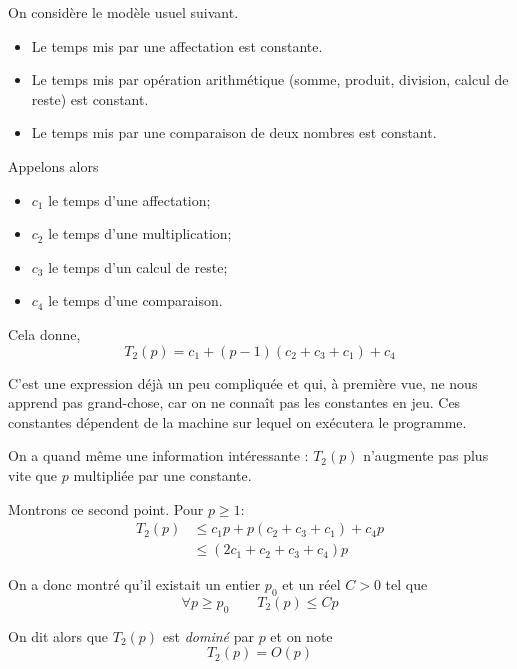 On considère le modèle usuel suivant.

\begin{itemize}
\item[\textbullet] Le temps mis par une affectation est constante.
\item[\textbullet] Le temps mis par opération arithmétique (somme, produit,
  division, calcul de reste) est constant.
\item[\textbullet] Le temps mis par une comparaison de deux nombres est constant.
\end{itemize}

Appelons alors
\begin{itemize}
\item[\textbullet] $c_{1}$ le temps d'une affectation;
\item[\textbullet] $c_{2}$ le temps d'une multiplication;
\item[\textbullet] $c_{3}$ le temps d'un calcul de reste;
\item[\textbullet] $c_{4}$ le temps d'une comparaison.
\end{itemize}

Cela donne,
\begin{equation*}
  T_{2}(p) = c_{1} + (p-1) (c_{2} + c_{3} + c_{1}) + c_{4}
\end{equation*}


C'est une expression déjà un peu compliquée et qui, à première vue,  ne nous apprend pas grand-chose, car on ne  connaît pas les constantes en jeu.
Ces constantes dépendent de la machine sur lequel on  exécutera le programme. 

On a quand même une information intéressante : $T_{2}(p)$ n'augmente pas plus vite que $p$ multipliée par une constante.

Montrons ce second point. Pour $p\geq 1$:
\begin{align*}
  T_{2}(p) &\leq c_{1}p + p(c_{2}+c_{3}+c_{1})+c_{4}p\\
  &\leq (2c_{1}+c_{2}+c_{3}+c_{4})p
\end{align*}


On a donc montré qu'il existait un entier $p_{0}$ et un réel $C>0$ tel que
\begin{equation*}
  \forall p\geq p_0 \qquad T_{2}(p)\leq Cp
\end{equation*}

On dit alors que $T_{2}(p)$ est \emph{dominé} par $p$ et on note
\begin{equation*}
  T_{2}(p) = O(p)
\end{equation*}

